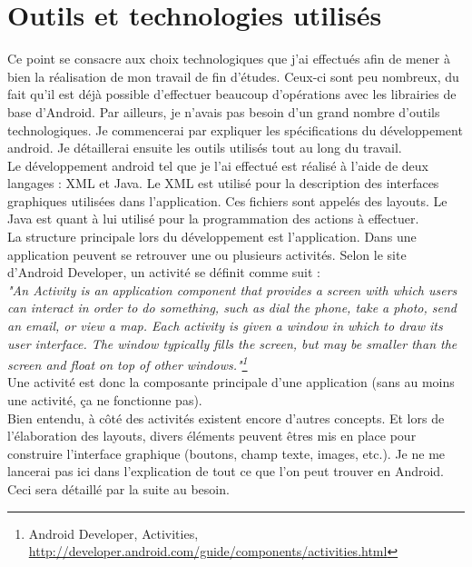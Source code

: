 \section{Outils et technologies utilisés}
Ce point se consacre aux choix technologiques que j'ai effectués afin de mener à bien la réalisation de mon travail de fin d'études. Ceux-ci sont peu nombreux, du fait qu'il est déjà possible d'effectuer beaucoup d'opérations avec les librairies de base d'Android. Par ailleurs, je n'avais pas besoin d'un grand nombre d'outils technologiques. Je commencerai par expliquer les spécifications du développement android. Je détaillerai ensuite les outils utilisés tout au long du travail.\\

Le développement android tel que je l'ai effectué est réalisé à l'aide de deux langages : XML et Java. Le XML est utilisé pour la description des interfaces graphiques utilisées dans l'application. Ces fichiers sont appelés des layouts. Le Java est quant à lui utilisé pour la programmation des actions à effectuer.\\

La structure principale lors du développement est l'application. Dans une application peuvent se retrouver une ou plusieurs activités. Selon le site d'Android Developer, un activité se définit comme suit :\\
\textit{"An Activity is an application component that provides a screen with which users can interact in order to do something, such as dial the phone, take a photo, send an email, or view a map. Each activity is given a window in which to draw its user interface. The window typically fills the screen, but may be smaller than the screen and float on top of other windows."\footnote{Android Developer, Activities, \url{http://developer.android.com/guide/components/activities.html}}}\\
Une activité est donc la composante principale d'une application (sans au moins une activité, ça ne fonctionne pas).\\

Bien entendu, à côté des activités existent encore d'autres concepts. Et lors de l'élaboration des layouts, divers éléments peuvent êtres mis en place pour construire l'interface graphique (boutons, champ texte, images, etc.). Je ne me lancerai pas ici dans l'explication de tout ce que l'on peut trouver en Android. Ceci sera détaillé par la suite au besoin.\\

